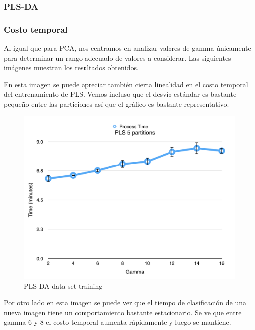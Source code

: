 \subsubsection{PLS-DA}

\subsubsection*{Costo temporal}

Al igual que para PCA, nos centramos en analizar valores de gamma únicamente para determinar un rango adecuado de valores a considerar. Las siguientes imágenes muestran los resultados obtenidos.

En esta imagen se puede apreciar también cierta linealidad en el costo temporal del entrenamiento de PLS. Vemos incluso que el desvío estándar es bastante pequeño entre las particiones así que el gráfico es bastante representativo.

\newpage

\begin{figure}[h!]
  \begin{center}
	\includegraphics[scale=0.7]{exp2/PLS-Process-Time.png}
	\caption{PLS-DA data set training}
  \end{center}
\end{figure}

Por otro lado en esta imagen se puede ver que el tiempo de clasificación de una nueva imagen tiene un comportamiento bastante estacionario. Se ve que entre gamma 6 y 8 el costo temporal aumenta rápidamente y luego se mantiene.

